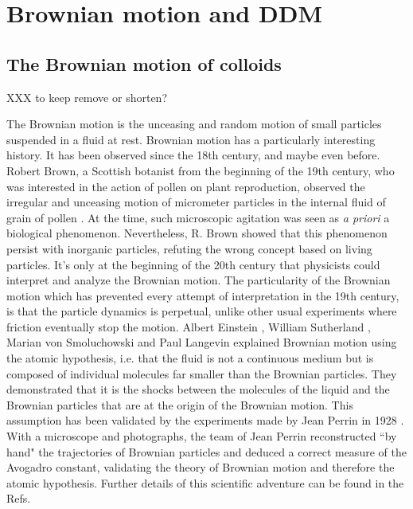 \documentclass[%
 aip,
 jmp,%
 amsmath,amssymb,
reprint,%
]{revtex4-1}
\newcommand{\tg}[1]{{\color{magenta}#1}} %
\begin{document}
\section{Brownian motion and DDM}
\label{sec:BrownSection}

\subsection{The Brownian motion of colloids}

\tg{XXX to keep remove or shorten?}

The Brownian motion is the unceasing and random motion of small particles suspended in a fluid at rest. Brownian motion has a particularly interesting history. It has been observed since the 18th century, and maybe even before. Robert Brown, a Scottish botanist from the beginning of the 19th century, who was interested in the action of pollen on plant reproduction, observed the irregular and unceasing motion of micrometer particles in the internal fluid of grain of pollen \citep{13_brown1828brief}. At the time, such microscopic agitation was seen as \textit{a priori} a biological phenomenon. Nevertheless, R. Brown showed that this phenomenon persist with inorganic particles, refuting the wrong concept based on living particles. It's only at the beginning of the 20th century that physicists could interpret and analyze the Brownian motion. The particularity of the Brownian motion which has prevented every attempt of interpretation in the 19th century, is that the particle dynamics is perpetual, unlike other usual experiments where friction eventually stop the motion. Albert Einstein \citep{9_einstein1906theory}, William Sutherland \citep{14_sutherland1905lxxv}, Marian von Smoluchowski \citep{10_von1906kinetischen} and Paul Langevin \citep{ajp1997lemons} explained Brownian motion using the atomic hypothesis, i.e. that the fluid is not a continuous medium but is composed of individual molecules far smaller than the Brownian particles. They demonstrated that it is the shocks between the molecules of the liquid and the Brownian particles that are at the origin of the Brownian motion. This assumption has been validated by the experiments made by Jean Perrin in 1928 \citep{22_perrin2014atomes}. With a microscope and photographs, the team of Jean Perrin reconstructed ``by hand" the trajectories of Brownian particles and deduced a correct measure of the Avogadro constant, validating the theory of Brownian motion and therefore the atomic hypothesis. Further details of this scientific adventure can be found in the Refs\cite{ajp1997lemons, ajp2006newburgh, ajp2006bergstein}.
\end{document}
